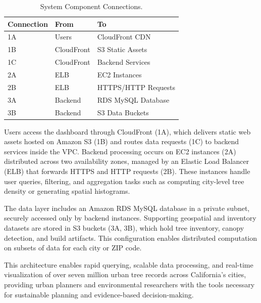 \begin{table}[h!]
\centering
\caption{System Component Connections.}
\label{tab:system_connections}
\begin{tabular}{p{2cm}p{3cm}p{6cm}}
\hline
\textbf{Connection} & \textbf{From} & \textbf{To} \\
\hline
1A & Users & CloudFront CDN \\
1B & CloudFront & S3 Static Assets \\
1C & CloudFront & Backend Services \\
2A & ELB & EC2 Instances \\
2B & ELB & HTTPS/HTTP Requests \\
3A & Backend & RDS MySQL Database \\
3B & Backend & S3 Data Buckets \\
\hline
\end{tabular}
\end{table}

Users access the dashboard through CloudFront (1A), which delivers static web assets hosted on Amazon S3 (1B) and routes data requests (1C) to backend services inside the VPC. Backend processing occurs on EC2 instances (2A) distributed across two availability zones, managed by an Elastic Load Balancer (ELB) that forwards HTTPS and HTTP requests (2B). These instances handle user queries, filtering, and aggregation tasks such as computing city-level tree density or generating spatial histograms.

The data layer includes an Amazon RDS MySQL database in a private subnet, securely accessed only by backend instances. Supporting geospatial and inventory datasets are stored in S3 buckets (3A, 3B), which hold tree inventory, canopy detection, and build artifacts. This configuration enables distributed computation on subsets of data for each city or ZIP code.

This architecture enables rapid querying, scalable data processing, and real-time visualization of over seven million urban tree records across California's cities, providing urban planners and environmental researchers with the tools necessary for sustainable planning and evidence-based decision-making.


